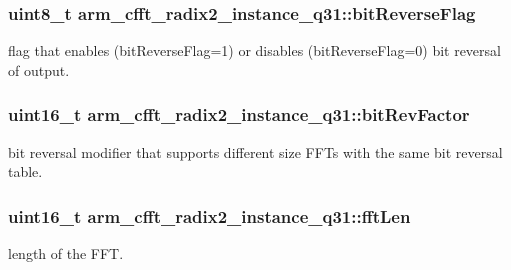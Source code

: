 \subsubsection[{\texorpdfstring{bit\+Reverse\+Flag}{bitReverseFlag}}]{\setlength{\rightskip}{0pt plus 5cm}uint8\+\_\+t arm\+\_\+cfft\+\_\+radix2\+\_\+instance\+\_\+q31\+::bit\+Reverse\+Flag}\hypertarget{structarm__cfft__radix2__instance__q31_a6239b8d268285334e88c008c07d68616}{}\label{structarm__cfft__radix2__instance__q31_a6239b8d268285334e88c008c07d68616}
flag that enables (bit\+Reverse\+Flag=1) or disables (bit\+Reverse\+Flag=0) bit reversal of output. 
\subsubsection[{\texorpdfstring{bit\+Rev\+Factor}{bitRevFactor}}]{\setlength{\rightskip}{0pt plus 5cm}uint16\+\_\+t arm\+\_\+cfft\+\_\+radix2\+\_\+instance\+\_\+q31\+::bit\+Rev\+Factor}\hypertarget{structarm__cfft__radix2__instance__q31_a9d17a87263953fe3559a007512c9f3a4}{}\label{structarm__cfft__radix2__instance__q31_a9d17a87263953fe3559a007512c9f3a4}
bit reversal modifier that supports different size F\+F\+Ts with the same bit reversal table. 
\subsubsection[{\texorpdfstring{fft\+Len}{fftLen}}]{\setlength{\rightskip}{0pt plus 5cm}uint16\+\_\+t arm\+\_\+cfft\+\_\+radix2\+\_\+instance\+\_\+q31\+::fft\+Len}\hypertarget{structarm__cfft__radix2__instance__q31_a960199f1373a192366878ef279eab00f}{}\label{structarm__cfft__radix2__instance__q31_a960199f1373a192366878ef279eab00f}
length of the F\+FT. 
